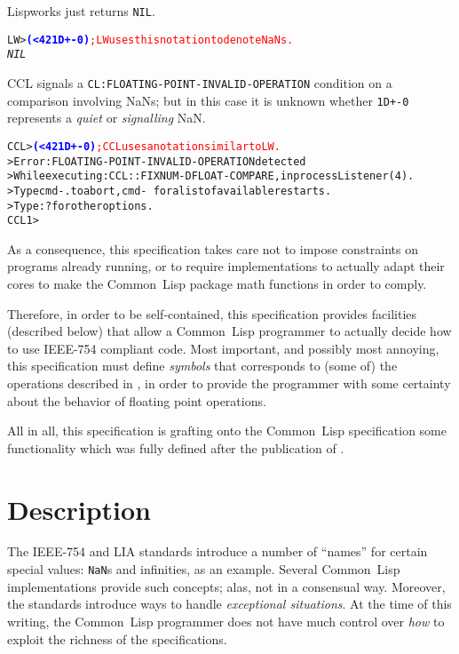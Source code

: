 \documentclass[10pt,fleqn]{article}
\newcommand{\CL}{\textsf{Common~Lisp}}
\newcommand{\code}[1]{\texttt{#1}}
\newcommand{\codeprompt}[1]{\textcolor{blue}{\textbf{#1}}}
\newcommand{\IEEEFPStd}{IEEE-754}
\begin{document}
\noindent
Lispworks just returns \code{NIL}.
\begin{alltt}
LW> \codeprompt{(< 42 1D+-0)} \textcolor{red}{; LW uses this notation to denote NaNs.}
\textit{NIL}
\end{alltt}

\vspace*{3mm}

\noindent
CCL signals a \code{CL:FLOATING-POINT-INVALID-OPERATION} condition on a
comparison involving NaNs; but in this case it is unknown whether
\code{1D+-0} represents a \emph{quiet} or \emph{signalling} NaN.
\begin{alltt}
CCL> \codeprompt{(< 42 1D+-0)} \textcolor{red}{; CCL uses a notation similar to LW.}
> Error: FLOATING-POINT-INVALID-OPERATION detected
> While executing: CCL::FIXNUM-DFLOAT-COMPARE, in process Listener(4).
> Type cmd-. to abort, cmd-\ for a list of available restarts.
> Type :? for other options.
CCL 1 > 
\end{alltt}

As a consequence, this specification takes care not to impose
constraints on programs already running, or to require implementations to
actually adapt their cores to make the \CL{} package math functions in
order to comply.

Therefore, in order to be self-contained, this specification provides
facilities (described below) that allow a \CL{} programmer to actually
decide how to use \IEEEFPStd{} compliant code.  Most important, and
possibly most annoying, this specification must define \emph{symbols}
that corresponds to (some of) the operations described in
\cite{2008:IEEE-754}, in order to provide the programmer with some
certainty about the behavior of floating point operations.

All in all, this specification is grafting onto the \CL{}
specification some functionality which was fully defined after the
publication of \cite{1996:ANSIHyperSpec}.


\newpage

\section{Description}

The \IEEEFPStd{} and LIA standards introduce a number of ``names'' for
certain special values: \code{NaN}s and infinities, as an example.
Several \CL{} implementations provide such concepts; alas, not in a
consensual way.  Moreover, the standards introduce ways to handle
\emph{exceptional situations}. At the time of this writing, the \CL{}
programmer does not have much control over \emph{how} to exploit the
richness of the specifications.
\end{document}
